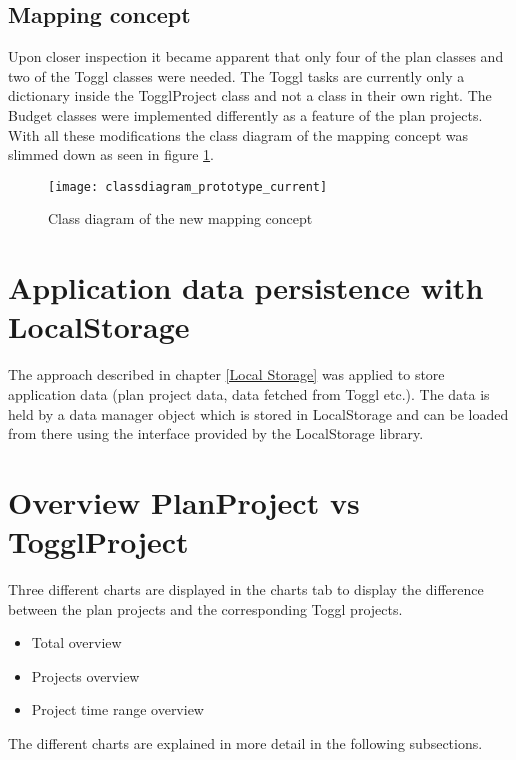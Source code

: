 \subsection{Mapping concept} \label{Mapping_result}
Upon closer inspection it became apparent that only four of the plan classes and two of the Toggl classes were needed. The Toggl tasks are currently only a dictionary inside the TogglProject class and not a class in their own right. The Budget classes were implemented differently as a feature of the plan projects. With all these modifications the class diagram of the mapping concept was slimmed down as seen in figure \ref{classdiagram_prototype_current}.
\begin{figure}[H]
	\centering
	\texttt{[image: classdiagram\_prototype\_current]}
	\caption{Class diagram of the new mapping concept}
	\label{classdiagram_prototype_current}
\end{figure}

\section{Application data persistence with LocalStorage}
The approach described in chapter \ref{Local Storage} was applied to store application data (plan project data, data fetched from Toggl etc.). The data is held by a data manager object which is stored in LocalStorage and can be loaded from there using the interface provided by the LocalStorage library.

\section{Overview PlanProject vs TogglProject} \label{Graphical overview}
Three different charts are displayed in the charts tab to display the difference between the plan projects and the corresponding Toggl projects.
\begin{itemize}
	\item Total overview
	\item Projects overview
	\item Project time range overview
\end{itemize}
The different charts are explained in more detail in the following subsections.

